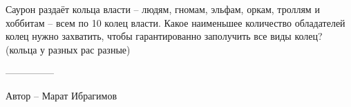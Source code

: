 \question
Саурон раздаёт кольца власти – людям, гномам, эльфам, оркам, троллям и хоббитам – всем по 10 колец власти. Какое наименьшее количество обладателей колец нужно захватить, чтобы гарантированно заполучить все виды колец? (кольца у разных рас разные)

---------------

Автор -- Марат Ибрагимов
